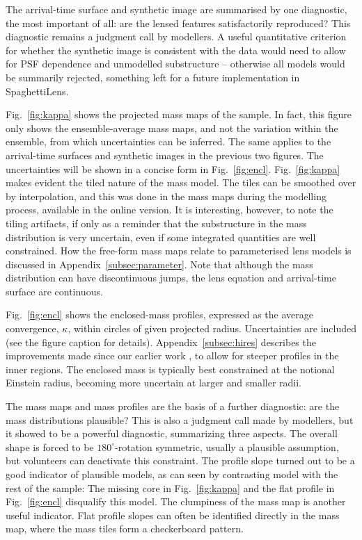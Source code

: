 The arrival-time surface and synthetic image are summarised by one
diagnostic, the most important of all: are the lensed features
satisfactorily reproduced?  This diagnostic remains a judgment call by
modellers.  A useful quantitative criterion for whether the synthetic
image is consistent with the data would need to allow for PSF
dependence and unmodelled substructure -- otherwise all models would
be summarily rejected, something left for a future implementation
in SpaghettiLens.


Fig.~\ref{fig:kappa} shows the projected mass maps of the sample.  In
fact, this figure only shows the ensemble-average mass maps, and not
the variation within the ensemble, from which uncertainties can be
inferred. The same applies to the arrival-time surfaces and synthetic
images in the previous two figures. The uncertainties will be shown in
a concise form in Fig.~\ref{fig:encl}.  Fig.~\ref{fig:kappa} makes
evident the tiled nature of the mass model.  The tiles can be smoothed
over by interpolation, and this was done in the mass maps during the
modelling process, available in the online version.  It is
interesting, however, to note the tiling artifacts, if only as a
reminder that the substructure in the mass distribution is very
uncertain, even if some integrated quantities are  well
constrained.  How the free-form mass maps relate to parameterised lens
models is discussed in Appendix~\ref{subsec:parameter}.
Note that although the mass distribution can have discontinuous jumps,
the lens equation and arrival-time surface are continuous.

Fig.~\ref{fig:encl} shows the enclosed-mass profiles, expressed as the
average convergence, $\kappa$, within circles of given projected
radius.  Uncertainties are included (see the figure caption for
details).
Appendix~\ref{subsec:hires} describes the improvements made
since our earlier work \citep{2015MNRAS.447.2170K}, to allow for
steeper profiles in the inner regions.  The enclosed mass is typically
best constrained at the notional Einstein radius, becoming more
uncertain at larger and smaller radii.

The mass maps and mass profiles are the basis of a further diagnostic:
are the mass distributions plausible? This is also a judgment call
made by modellers, but it showed to be a powerful diagnostic,
summarizing three aspects. The overall shape is forced to be
$180^\circ$-rotation symmetric, usually a plausible assumption, but
volunteers can deactivate this constraint. The profile slope turned
out to be a good indicator of plausible models, as can seen by
contrasting model  with the rest of the sample:  The missing
core in Fig.~\ref{fig:kappa} and the flat profile in
Fig.~\ref{fig:encl} disqualify this model. The clumpiness of the
mass map is another useful indicator. Flat profile slopes can often be
identified directly in the mass map, where the mass tiles form a
checkerboard pattern.


